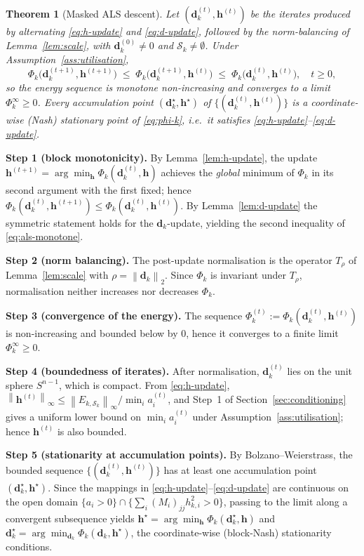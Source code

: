 \documentclass[journal,onecolumn,11pt]{IEEEtran}
\newtheorem{theorem}{Theorem}
\theoremstyle{definition}
\newcommand{\norm}[1]{\left\lVert #1 \right\rVert}
\newcommand{\Sk}{\mathcal{S}_k}
\newcommand{\dvec}{\bm{d}}
\newcommand{\hvec}{\bm{h}}
\begin{document}
\begin{theorem}[Masked ALS descent]
\label{thm:als-descent}
Let $(\dvec_k^{(t)},\hvec^{(t)})$ be the iterates produced by alternating
\eqref{eq:h-update} and \eqref{eq:d-update}, followed by the
norm-balancing of Lemma~\ref{lem:scale}, with $\dvec_k^{(0)}\neq 0$ and
$\Sk\neq\emptyset$. Under Assumption~\ref{ass:utilisation},
\begin{equation}
\Phi_k\bigl(\dvec_k^{(t+1)},\hvec^{(t+1)}\bigr)
\;\le\;
\Phi_k\bigl(\dvec_k^{(t+1)},\hvec^{(t)}\bigr)
\;\le\;
\Phi_k\bigl(\dvec_k^{(t)},\hvec^{(t)}\bigr),
\quad t\ge 0,
\label{eq:als-monotone}
\end{equation}
so the energy sequence is monotone non-increasing and converges to a
limit $\Phi_k^\infty\ge 0$. Every accumulation point
$(\dvec_k^\star,\hvec^\star)$ of $\{(\dvec_k^{(t)},\hvec^{(t)})\}$ is a
coordinate-wise (Nash) stationary point of \eqref{eq:phi-k}, i.e.\ it
satisfies \eqref{eq:h-update}--\eqref{eq:d-update}.
\end{theorem}

\begin{IEEEproof}
\textbf{Step 1 (block monotonicity).} By Lemma~\ref{lem:h-update}, the
update $\hvec^{(t+1)}=\arg\min_{\hvec}\Phi_k(\dvec_k^{(t)},\hvec)$ achieves the
\emph{global} minimum of $\Phi_k$ in its second argument with the first
fixed; hence
$\Phi_k(\dvec_k^{(t)},\hvec^{(t+1)})\le\Phi_k(\dvec_k^{(t)},\hvec^{(t)})$. By
Lemma~\ref{lem:d-update} the symmetric statement holds for the
$\dvec_k$-update, yielding the second inequality of
\eqref{eq:als-monotone}.

\textbf{Step 2 (norm balancing).} The post-update normalisation is the
operator $T_\rho$ of Lemma~\ref{lem:scale} with $\rho=\norm{\dvec_k}_2$.
Since $\Phi_k$ is invariant under $T_\rho$, normalisation neither
increases nor decreases $\Phi_k$.

\textbf{Step 3 (convergence of the energy).} The sequence
$\Phi_k^{(t)}:=\Phi_k(\dvec_k^{(t)},\hvec^{(t)})$ is non-increasing and
bounded below by $0$, hence it converges to a finite limit
$\Phi_k^\infty\ge 0$.

\textbf{Step 4 (boundedness of iterates).} After normalisation,
$\dvec_k^{(t)}$ lies on the unit sphere $S^{n-1}$, which is compact. From
\eqref{eq:h-update}, $\norm{\hvec^{(t)}}_\infty \le
\norm{E_{k,\Sk}}_\infty/\min_i a_i^{(t)}$, and Step~1 of
Section~\ref{sec:conditioning} gives a uniform lower bound on
$\min_i a_i^{(t)}$ under Assumption~\ref{ass:utilisation}; hence
$\hvec^{(t)}$ is also bounded.

\textbf{Step 5 (stationarity at accumulation points).} By
Bolzano--Weierstrass, the bounded sequence
$\{(\dvec_k^{(t)},\hvec^{(t)})\}$ has at least one accumulation point
$(\dvec_k^\star,\hvec^\star)$. Since the mappings in
\eqref{eq:h-update}--\eqref{eq:d-update} are continuous on the open
domain $\{a_i>0\}\cap\{\sum_i (M_i)_{jj}h_{k,i}^2>0\}$, passing to the
limit along a convergent subsequence yields
$\hvec^\star=\arg\min_{\hvec}\Phi_k(\dvec_k^\star,\hvec)$ and
$\dvec_k^\star=\arg\min_{\dvec_k}\Phi_k(\dvec_k,\hvec^\star)$, the
coordinate-wise (block-Nash) stationarity conditions.
\end{IEEEproof}
\end{document}
